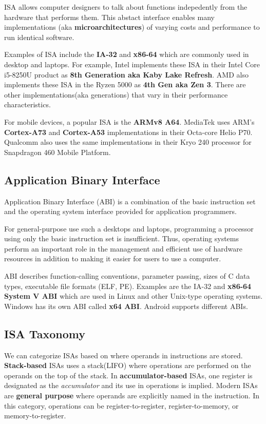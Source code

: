 \documentclass[a4paper, 11pt,oneside]{article}
\begin{document}
ISA allows computer designers to talk about functions indepedently from the 
hardware that performs them. This abstact interface enables many 
implementations (aka \textbf{microarchitectures}) of varying costs and 
performance to run identical software.

Examples of ISA include the \textbf{IA-32} and \textbf{x86-64}\cite{AMD64ISA} 
which are commonly used in desktop and laptops. For example, Intel implements 
these ISA in their Intel Core i5-8250U\cite{Corei5} product as \textbf{8th 
Generation aka Kaby Lake Refresh}\cite{KarbyLaKeR}. AMD also implements these 
ISA in the Ryzen 5000 \cite{Ryzen5000} as \textbf{4th Gen aka Zen 
3}\cite{Zen3}. There are other implementations(aka generations) that vary in 
their performance characteristics.

For mobile devices, a popular ISA is the \textbf{ARMv8 A64}\cite{ARMv8ISA}. 
MediaTek uses ARM's \textbf{Cortex-A73} and \textbf{Cortex-A53}\cite{CortexA73} 
implementations in their Octa-core Helio P70\cite{HelioP70}. Qualcomm also uses 
the same implementations in their Kryo 240 processor for Snapdragon 460 Mobile 
Platform\cite{Snapdragon460}.

\subsection{Application Binary Interface}
Application Binary Interface (ABI) is a combination of the basic instruction 
set and the operating system interface provided for application 
programmers\cite{CODARM}. 

For general-purpose use such a desktops and laptops, programming a processor 
using only the basic instruction set is insufficient. Thus, operating systems 
perform an important role in the management and efficient use of hardware 
resources in addition to making it easier for users to use a computer. 

ABI describes function-calling conventions, parameter passing, sizes of 
C data types, executable file formats (ELF, PE). Examples are the IA-32 and 
\textbf{x86-64 System V ABI}\cite{x64ABI} which are used in Linux and other 
Unix-type 
operating systems. Windows has its own ABI called \textbf{x64 
ABI}\cite{Winx64ABI}. Android supports different ABIs\cite{AndroidABI}.


\subsection{ISA Taxonomy}
We can categorize ISAs based on where operands in instructions are stored.
\textbf{Stack-based} ISAs uses a stack(LIFO) where operations are performed on 
the operands on the top of the stack. In \textbf{accumulator-based} ISAs, one 
register is designated as the \textit{accumulator} and its use in operations is 
implied. Modern ISAs are \textbf{general purpose} where operands are explicitly 
named in the instruction. In this category, operations can be 
register-to-register, register-to-memory, or memory-to-register.
\end{document}
